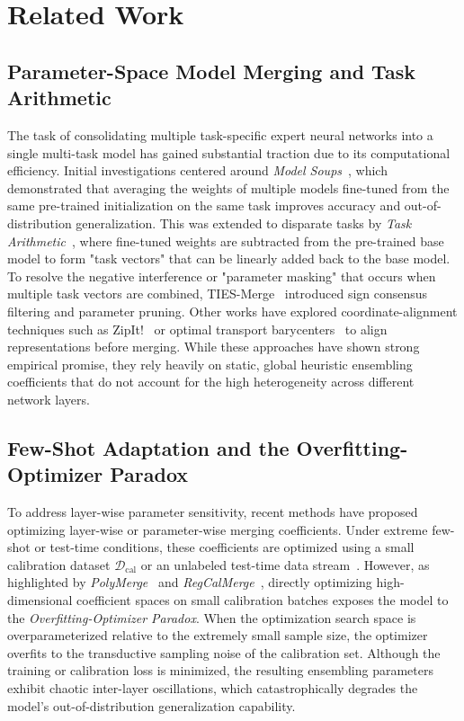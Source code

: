 \section{Related Work}
\label{sec:related}

\subsection{Parameter-Space Model Merging and Task Arithmetic}
The task of consolidating multiple task-specific expert neural networks into a single multi-task model has gained substantial traction due to its computational efficiency. Initial investigations centered around \emph{Model Soups}~\cite{wortsman2022model}, which demonstrated that averaging the weights of multiple models fine-tuned from the same pre-trained initialization on the same task improves accuracy and out-of-distribution generalization. This was extended to disparate tasks by \emph{Task Arithmetic}~\cite{ilharco2022editing}, where fine-tuned weights are subtracted from the pre-trained base model to form "task vectors" that can be linearly added back to the base model. To resolve the negative interference or "parameter masking" that occurs when multiple task vectors are combined, TIES-Merge~\cite{yadav2023ties} introduced sign consensus filtering and parameter pruning. Other works have explored coordinate-alignment techniques such as ZipIt!~\cite{stoica2023zipit} or optimal transport barycenters~\cite{matena2022merging} to align representations before merging. While these approaches have shown strong empirical promise, they rely heavily on static, global heuristic ensembling coefficients that do not account for the high heterogeneity across different network layers.

\subsection{Few-Shot Adaptation and the Overfitting-Optimizer Paradox}
To address layer-wise parameter sensitivity, recent methods have proposed optimizing layer-wise or parameter-wise merging coefficients. Under extreme few-shot or test-time conditions, these coefficients are optimized using a small calibration dataset $\mathcal{D}_{\text{cal}}$ or an unlabeled test-time data stream~\cite{trial2_submission1, trial3_submission2}. However, as highlighted by \emph{PolyMerge}~\cite{trial2_submission3} and \emph{RegCalMerge}~\cite{trial2_submission1}, directly optimizing high-dimensional coefficient spaces on small calibration batches exposes the model to the \emph{Overfitting-Optimizer Paradox}. When the optimization search space is overparameterized relative to the extremely small sample size, the optimizer overfits to the transductive sampling noise of the calibration set. Although the training or calibration loss is minimized, the resulting ensembling parameters exhibit chaotic inter-layer oscillations, which catastrophically degrades the model's out-of-distribution generalization capability.

